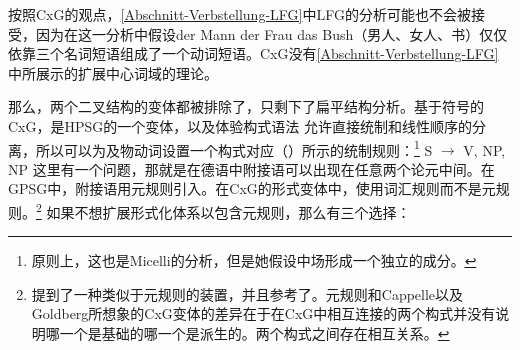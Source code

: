 按照CxG的观点，\ref{Abschnitt-Verbstellung-LFG}中LFG的分析可能也不会被接受，因为在这一分析中假设der Mann der Frau das Bush（男人、女人、书）仅仅依靠三个名词短语组成了一个动词短语。CxG没有\ref{Abschnitt-Verbstellung-LFG}中所展示的扩展中心词域的理论。

那么，两个二叉结构的变体都被排除了，只剩下了扁平结构分析。基于符号的CxG，是HPSG的一个变体\citep[]{Sag2010b}，以及体验构式语法 \citep[]{BC2005a}允许直接统制和线性顺序的分离，所以可以为及物动词设置一个构式对应（）所示的统制规则：\footnote{%
	原则上，这也是Micelli的分析，但是她假设中场形成一个独立的成分。%
}
\ea
S $\to$ V, NP, NP
\z
这里有一个问题，那就是在德语中附接语可以出现在任意两个论元中间。在GPSG中，附接语用元规则引入。在CxG的形式变体中，使用词汇规则而不是元规则。\footnote{\label{fn-allostructions}%
  \citet[]{Goldberg2014a}提到了一种类似于元规则的装置，并且参考了。元规则和Cappelle以及Goldberg所想象的CxG变体的差异在于在CxG中相互连接的两个构式并没有说明哪一个是基础的哪一个是派生的。两个构式之间存在相互关系。%
} 如果不想扩展形式化体系以包含元规则，那么有三个选择：
